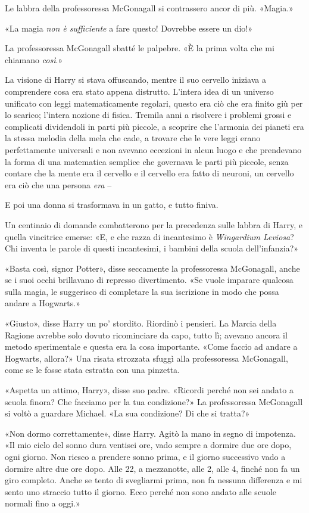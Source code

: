 Le labbra della professoressa McGonagall si contrassero ancor di più. «Magia.»

«La magia \textit{non è sufficiente} a fare questo! Dovrebbe essere un dio!»

La professoressa McGonagall sbatté le palpebre. «È la prima volta che mi chiamano \textit{così}.»

La visione di Harry si stava offuscando, mentre il suo cervello iniziava a comprendere cosa era stato appena distrutto. L’intera idea di un universo unificato con leggi matematicamente regolari, questo era ciò che era finito giù per lo scarico; l’intera nozione di fisica. Tremila anni a risolvere i problemi grossi e complicati dividendoli in parti più piccole, a scoprire che l’armonia dei pianeti era la stessa melodia della mela che cade, a trovare che le vere leggi erano perfettamente universali e non avevano eccezioni in alcun luogo e che prendevano la forma di una matematica semplice che governava le parti più piccole, senza contare che la mente era il cervello e il cervello era fatto di neuroni, un cervello era ciò che una persona \textit{era} –

E poi una donna si trasformava in un gatto, e tutto finiva.

Un centinaio di domande combatterono per la precedenza sulle labbra di Harry, e quella vincitrice emerse: «E, e che razza di incantesimo è \textit{Wingardium Leviosa}? Chi inventa le parole di questi incantesimi, i bambini della scuola dell’infanzia?»

«Basta così, signor Potter», disse seccamente la professoressa McGonagall, anche se i suoi occhi brillavano di represso divertimento. «Se vuole imparare qualcosa sulla magia, le suggerisco di completare la sua iscrizione in modo che possa andare a Hogwarts.»

«Giusto», disse Harry un po’ stordito. Riordinò i pensieri. La Marcia della Ragione avrebbe solo dovuto ricominciare da capo, tutto lì; avevano ancora il metodo sperimentale e questa era la cosa importante. «Come faccio ad andare a Hogwarts, allora?»
Una risata strozzata sfuggì alla professoressa McGonagall, come se le fosse stata estratta con una pinzetta.

«Aspetta un attimo, Harry», disse suo padre. «Ricordi perché non sei andato a scuola finora? Che facciamo per la tua condizione?»
La professoressa McGonagall si voltò a guardare Michael. «La sua condizione? Di che si tratta?»

«Non dormo correttamente», disse Harry. Agitò la mano in segno di impotenza. «Il mio ciclo del sonno dura ventisei ore, vado sempre a dormire due ore dopo, ogni giorno. Non riesco a prendere sonno prima, e il giorno successivo vado a dormire altre due ore dopo. Alle 22, a mezzanotte, alle 2, alle 4, finché non fa un giro completo. Anche se tento di svegliarmi prima, non fa nessuna differenza e mi sento uno straccio tutto il giorno. Ecco perché non sono andato alle scuole normali fino a oggi.»

